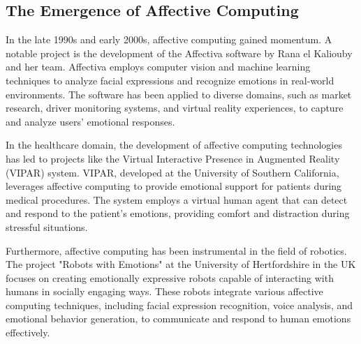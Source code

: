\subsection{The Emergence of Affective Computing}
In the late 1990s and early 2000s, affective computing gained momentum. 
A notable project is the development of the Affectiva \cite*{affectiva} software by Rana el Kaliouby and her team. 
Affectiva employs computer vision and machine learning techniques to analyze facial expressions and recognize emotions in real-world environments.
The software has been applied to diverse domains, such as market research, driver monitoring systems, and virtual reality experiences, 
to capture and analyze users' emotional responses.

In the healthcare domain, the development of affective computing technologies has led to projects like the Virtual Interactive Presence in Augmented Reality (VIPAR) system. 
VIPAR, developed at the University of Southern California, leverages affective computing to provide emotional support for patients during medical procedures. 
The system employs a virtual human agent that can detect and respond to the patient's emotions, providing comfort and distraction during stressful situations.

Furthermore, affective computing has been instrumental in the field of robotics. 
The project "Robots with Emotions" at the University of Hertfordshire in the UK focuses 
on creating emotionally expressive robots capable of interacting with humans in socially engaging ways. 
These robots integrate various affective computing techniques, including facial expression recognition, voice analysis, and emotional behavior generation, 
to communicate and respond to human emotions effectively.